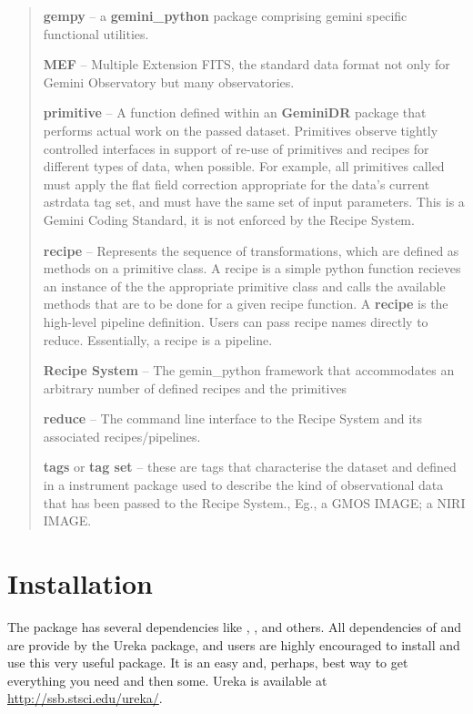 \documentclass[letterpaper,10pt,english]{sphinxmanual}
\begin{document}
\begin{quote}
\textbf{gempy} -- a \textbf{gemini\_python} package comprising gemini specific functional
utilities.

\textbf{MEF} -- Multiple Extension FITS, the standard data format not only for
Gemini Observatory but many observatories.

\textbf{primitive} -- A function defined within an \textbf{GeminiDR} package that
performs actual work on the passed dataset. Primitives observe tightly
controlled interfaces in support of re-use of primitives and recipes for
different types of data, when possible. For example, all primitives called
 must apply the flat field correction appropriate for the data’s
current astrdata tag set, and must have the same set of input parameters.  This
is a Gemini Coding Standard, it is not enforced by the Recipe System.

\textbf{recipe} -- Represents the sequence of transformations, which are defined as
methods on a primitive class. A recipe is a simple python function recieves an
instance of the the appropriate primitive class and calls the available methods
that are to be done for a given recipe function. A \textbf{recipe} is the high-level
pipeline definition. Users can pass recipe names directly to reduce. Essentially,
a recipe is a pipeline.

\textbf{Recipe System} -- The gemin\_python framework that accommodates an arbitrary
number of defined recipes and the primitives

\textbf{reduce} -- The command line interface to the Recipe System and its associated
recipes/pipelines.

\textbf{tags} or \textbf{tag set} --  these are tags that characterise the dataset and
defined in a  instrument package used to describe the
kind of observational data that has been passed to the Recipe System.,
Eg., a GMOS IMAGE; a NIRI IMAGE.
\end{quote}


\chapter{Installation}
\label{userenv:installation}\label{userenv::doc}
The  package has several dependencies like , ,
and others. All dependencies of  and  are provide by
the Ureka package, and users are highly encouraged to install and use this very
useful package. It is an easy and, perhaps, best way to get everything you need
and then some. Ureka is available at \href{http://ssb.stsci.edu/ureka/}{http://ssb.stsci.edu/ureka/}.
\end{document}
